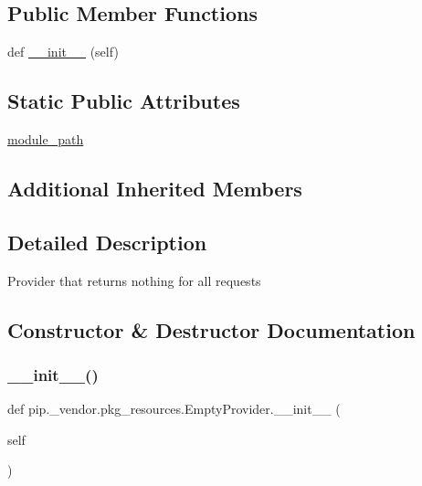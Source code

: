 \subsection*{Public Member Functions}
\begin{DoxyCompactItemize}
\item 
def \hyperlink{classpip_1_1__vendor_1_1pkg__resources_1_1EmptyProvider_a608cb39ece7ac6abd90d03e47a48195c}{\+\_\+\+\_\+init\+\_\+\+\_\+} (self)
\end{DoxyCompactItemize}
\subsection*{Static Public Attributes}
\begin{DoxyCompactItemize}
\item 
\hyperlink{classpip_1_1__vendor_1_1pkg__resources_1_1EmptyProvider_a4fe1254c2b8db26e696e6bfd46174e8a}{module\+\_\+path}
\end{DoxyCompactItemize}
\subsection*{Additional Inherited Members}


\subsection{Detailed Description}
\begin{DoxyVerb}Provider that returns nothing for all requests\end{DoxyVerb}
 

\subsection{Constructor \& Destructor Documentation}
\mbox{\label{classpip_1_1__vendor_1_1pkg__resources_1_1EmptyProvider_a608cb39ece7ac6abd90d03e47a48195c}} 
\subsubsection{\texorpdfstring{\+\_\+\+\_\+init\+\_\+\+\_\+()}{\_\_init\_\_()}}
{\footnotesize\ttfamily def pip.\+\_\+vendor.\+pkg\+\_\+resources.\+Empty\+Provider.\+\_\+\+\_\+init\+\_\+\+\_\+ (\begin{DoxyParamCaption}\item[{}]{self }\end{DoxyParamCaption})}



